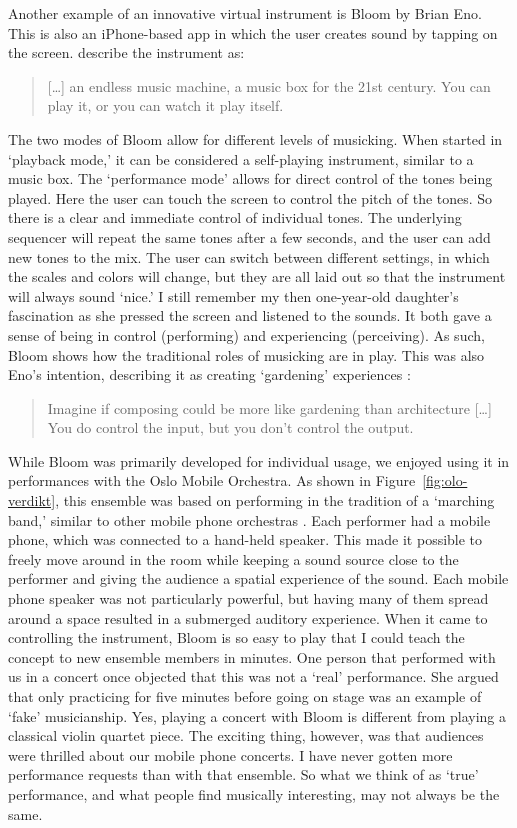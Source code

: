 Another example of an innovative virtual instrument is Bloom by Brian Eno. This is also an iPhone-based app in which the user creates sound by tapping on the screen. \citet{eno_bloom_2008} describe the instrument as:

\begin{quote}
	[\ldots] an endless music machine, a music box for the 21st century. You can play it, or you can watch it play itself.
\end{quote}

The two modes of Bloom allow for different levels of musicking. When started in `playback mode,' it can be considered a self-playing instrument, similar to a music box. The `performance mode' allows for direct control of the tones being played. Here the user can touch the screen to control the pitch of the tones. So there is a clear and immediate control of individual tones. The underlying sequencer will repeat the same tones after a few seconds, and the user can add new tones to the mix. The user can switch between different settings, in which the scales and colors will change, but they are all laid out so that the instrument will always sound `nice.' I still remember my then one-year-old daughter's fascination as she pressed the screen and listened to the sounds. It both gave a sense of being in control (performing) and experiencing (perceiving). As such, Bloom shows how the traditional roles of musicking are in play. This was also Eno's intention, describing it as creating `gardening' experiences \citep{clark_estes_first_2018}:

\begin{quote}
	Imagine if composing could be more like gardening than architecture [\ldots] You do control the input, but you don’t control the output.
\end{quote}

While Bloom was primarily developed for individual usage, we enjoyed using it in performances with the Oslo Mobile Orchestra. As shown in Figure~\ref{fig:olo-verdikt}, this ensemble was based on performing in the tradition of a `marching band,' similar to other mobile phone orchestras \citep{oh_evolving_2010}. Each performer had a mobile phone, which was connected to a hand-held speaker. This made it possible to freely move around in the room while keeping a sound source close to the performer and giving the audience a spatial experience of the sound. Each mobile phone speaker was not particularly powerful, but having many of them spread around a space resulted in a submerged auditory experience. When it came to controlling the instrument, Bloom is so easy to play that I could teach the concept to new ensemble members in minutes. One person that performed with us in a concert once objected that this was not a `real' performance. She argued that only practicing for five minutes before going on stage was an example of `fake' musicianship. Yes, playing a concert with Bloom is different from playing a classical violin quartet piece. The exciting thing, however, was that audiences were thrilled about our mobile phone concerts. I have never gotten more performance requests than with that ensemble. So what we think of as `true' performance, and what people find musically interesting, may not always be the same.

